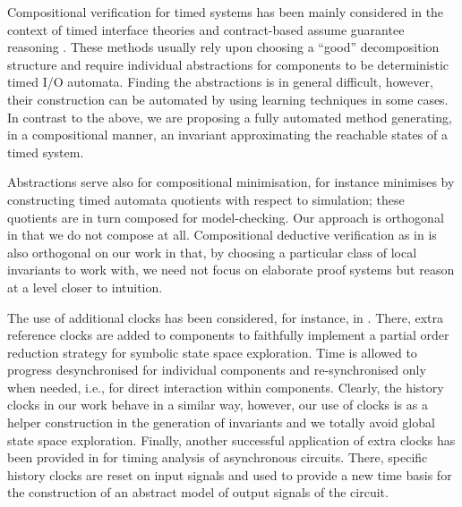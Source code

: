 \documentclass{LMCS}
\newcommand{\mycomment}[1]{}
\newcommand{\todo}[1]{\textcolor{OrangeRed}{TODO: #1}}
\theoremstyle{plain}\newtheorem{remark}[thm]{Remark}
\theoremstyle{plain}\newtheorem{example}[thm]{Example}
\begin{document}
\begin{enumerate}
Compositional verification for timed systems has been mainly
considered in the context of timed interface theories \cite{Alfaro02}
and contract-based assume guarantee reasoning
\cite{Ecdar,AutomaticCompERAs,mocha}. These methods usually rely upon
choosing a ``good'' decomposition structure and require individual
abstractions for components to be deterministic timed I/O
automata. Finding the abstractions is in general difficult, however,
their construction can be automated by using learning techniques
\cite{AutomaticCompERAs} in some cases. In contrast to the above, we
are proposing a fully automated method generating, in a compositional
manner, an invariant approximating the reachable states of a timed
system.  

Abstractions serve also for compositional minimisation, for instance
\cite{berendsen08} minimises by constructing timed automata quotients
with respect to simulation; these quotients are in turn composed for
model-checking. Our approach is orthogonal in that we do not compose
at all. Compositional deductive verification as in \cite{boer97} is
also orthogonal on our work in that, by choosing a particular class of
local invariants to work with, we need not focus on elaborate proof
systems but reason at a level closer to intuition.

The use of additional clocks has been considered, for instance, in
\cite{Bengtsson98, pettersson07:partial}. There, extra reference
clocks are added to components to faithfully implement a partial order
reduction strategy for symbolic state space exploration. Time is
allowed to progress desynchronised for individual components and
re-synchronised only when needed, i.e., for direct interaction within
components. Clearly, the history clocks in our work behave in a
similar way, however, our use of clocks is as a helper construction in
the generation of invariants and we totally avoid global state space
exploration. Finally, another successful application of extra clocks
has been provided in \cite{SalahBM09} for timing analysis of
asynchronous circuits. There, specific history clocks are reset on
input signals and used to provide a new time basis for the
construction of an abstract model of output signals of the circuit.

\mycomment{
\todo{abstraction + 3 refs from the last reviewer }

Finally, we note that there is notable work on abstraction \cite{...}.
This work is orthogonal on our approach: the abstractions are with
respect to global states, consequently, their applicability to systems
with a great number of components is problematic.

}
\end{enumerate}
\end{document}
